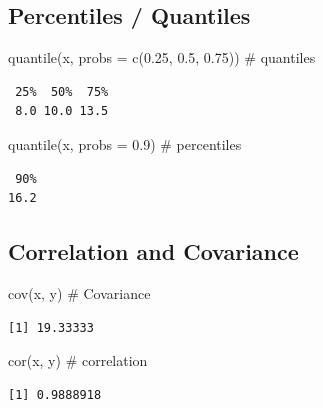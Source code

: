 \documentclass[
  letterpaper,
  DIV=11,
  numbers=noendperiod]{scrreprt}
\newenvironment{Shaded}{\begin{snugshade}}{\end{snugshade}}
\newcommand{\AttributeTok}[1]{\textcolor[rgb]{0.40,0.45,0.13}{#1}}
\newcommand{\CommentTok}[1]{\textcolor[rgb]{0.37,0.37,0.37}{#1}}
\newcommand{\FloatTok}[1]{\textcolor[rgb]{0.68,0.00,0.00}{#1}}
\newcommand{\FunctionTok}[1]{\textcolor[rgb]{0.28,0.35,0.67}{#1}}
\newcommand{\NormalTok}[1]{\textcolor[rgb]{0.00,0.23,0.31}{#1}}
\begin{document}
\subsection{Percentiles / Quantiles}\label{percentiles-quantiles}

\begin{Shaded}
\begin{Highlighting}[]
\FunctionTok{quantile}\NormalTok{(x, }\AttributeTok{probs =} \FunctionTok{c}\NormalTok{(}\FloatTok{0.25}\NormalTok{, }\FloatTok{0.5}\NormalTok{, }\FloatTok{0.75}\NormalTok{)) }\CommentTok{\# quantiles}
\end{Highlighting}
\end{Shaded}

\begin{verbatim}
 25%  50%  75% 
 8.0 10.0 13.5 
\end{verbatim}

\begin{Shaded}
\begin{Highlighting}[]
\FunctionTok{quantile}\NormalTok{(x, }\AttributeTok{probs =} \FloatTok{0.9}\NormalTok{) }\CommentTok{\# percentiles}
\end{Highlighting}
\end{Shaded}

\begin{verbatim}
 90% 
16.2 
\end{verbatim}

\subsection{Correlation and
Covariance}\label{correlation-and-covariance}

\begin{Shaded}
\begin{Highlighting}[]
\FunctionTok{cov}\NormalTok{(x, y) }\CommentTok{\# Covariance}
\end{Highlighting}
\end{Shaded}

\begin{verbatim}
[1] 19.33333
\end{verbatim}

\begin{Shaded}
\begin{Highlighting}[]
\FunctionTok{cor}\NormalTok{(x, y) }\CommentTok{\# correlation}
\end{Highlighting}
\end{Shaded}

\begin{verbatim}
[1] 0.9888918
\end{verbatim}
\end{document}
